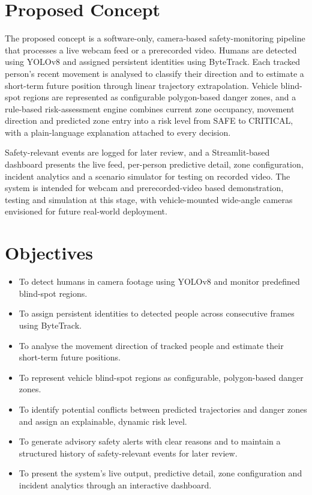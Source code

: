 \documentclass[12pt,a4paper]{report}
\begin{document}
\section{Proposed Concept}
The proposed concept is a software-only, camera-based safety-monitoring pipeline that processes a live webcam feed or a prerecorded video. Humans are detected using YOLOv8 and assigned persistent identities using ByteTrack. Each tracked person's recent movement is analysed to classify their direction and to estimate a short-term future position through linear trajectory extrapolation. Vehicle blind-spot regions are represented as configurable polygon-based danger zones, and a rule-based risk-assessment engine combines current zone occupancy, movement direction and predicted zone entry into a risk level from SAFE to CRITICAL, with a plain-language explanation attached to every decision.

Safety-relevant events are logged for later review, and a Streamlit-based dashboard presents the live feed, per-person predictive detail, zone configuration, incident analytics and a scenario simulator for testing on recorded video. The system is intended for webcam and prerecorded-video based demonstration, testing and simulation at this stage, with vehicle-mounted wide-angle cameras envisioned for future real-world deployment.

\section{Objectives}
\begin{itemize}[leftmargin=*,itemsep=2pt]
\item To detect humans in camera footage using YOLOv8 and monitor predefined blind-spot regions.
\item To assign persistent identities to detected people across consecutive frames using ByteTrack.
\item To analyse the movement direction of tracked people and estimate their short-term future positions.
\item To represent vehicle blind-spot regions as configurable, polygon-based danger zones.
\item To identify potential conflicts between predicted trajectories and danger zones and assign an explainable, dynamic risk level.
\item To generate advisory safety alerts with clear reasons and to maintain a structured history of safety-relevant events for later review.
\item To present the system's live output, predictive detail, zone configuration and incident analytics through an interactive dashboard.
\end{itemize}
\end{document}
